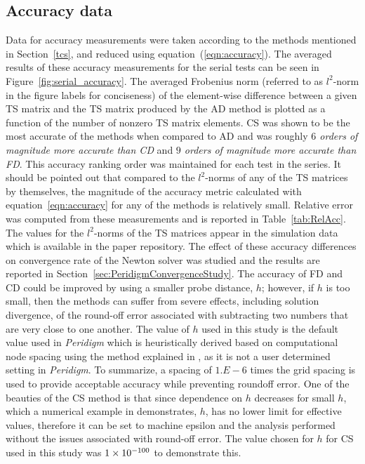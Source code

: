 \documentclass[preprint,12pt]{elsarticle}
\begin{document}
\subsection{Accuracy data}
%
Data for accuracy measurements were taken according to the methods mentioned in Section~\ref{tcs}, and reduced using equation~(\ref{eqn:accuracy}). The averaged results of these accuracy measurements for the serial tests can be seen in Figure~\ref{fig:serial_accuracy}. The averaged Frobenius norm (referred to as $l^2$-norm in the figure labels for conciseness) of the element-wise difference between a given TS matrix and the TS matrix produced by the AD method is plotted as a function of the number of nonzero TS matrix elements. CS was shown to be the most accurate of the methods when compared to AD and was roughly \emph{$6$ orders of magnitude more accurate than CD} and \emph{$9$ orders of magnitude more accurate than FD}. This accuracy ranking order was maintained for each test in the series. It should be pointed out that compared to the $l^2$-norms of any of the TS matrices by themselves, the magnitude of the accuracy metric calculated with equation~\ref{eqn:accuracy} for any of the methods is relatively small. Relative error was computed from these measurements and is reported in Table~\ref{tab:RelAcc}. The values for the $l^2$-norms of the TS matrices appear in the simulation data which is available in the paper repository. The effect of these accuracy differences on convergence rate of the Newton solver was studied and the results are reported in Section~\ref{sec:PeridigmConvergenceStudy}.  
%
The accuracy of FD and CD could be improved by using a smaller probe distance, $h$; however, if $h$ is too small, then the methods can suffer from severe effects, including solution divergence, of the round-off error associated with subtracting two numbers that are very close to one another.  The value of $h$ used in this study is the default value used in \emph{Peridigm} which is heuristically derived based on computational node spacing using the method explained in \cite[pp. 90]{ref-Adaggio}, as it is not a user determined setting in \emph{Peridigm}.  To summarize, a spacing of $1.E-6$ times the grid spacing is used to provide acceptable accuracy while preventing roundoff error. One of the beauties of the CS method is that since dependence on $h$ decreases for small $h$, which a numerical example in \cite[Table 1]{squire1998using} demonstrates, $h$, has no lower limit for effective values, therefore it can be set to machine epsilon and the analysis performed without the issues associated with round-off error. The value chosen for $h$ for CS used in this study was $\num{1.E-100}$ to demonstrate this.
\end{document}
